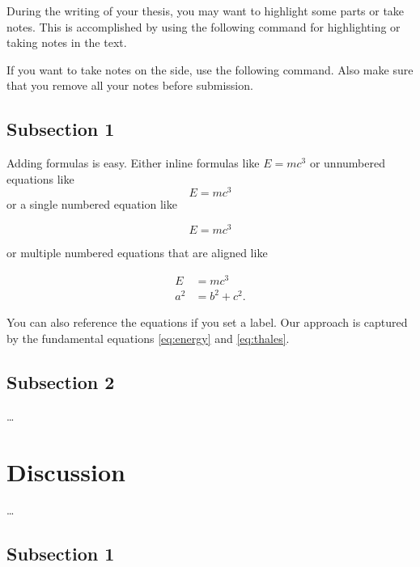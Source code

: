 During the writing of your thesis, you may want to highlight some parts or take notes. This is accomplished by using the following command for highlighting or taking notes in the text. 


If you want to take notes on the side, use the following command. Also make sure that you remove all your notes before submission.



\section{Subsection 1}
\label{ch:section2:sec:subsection1}
Adding formulas is easy. Either inline formulas like $E=mc^3$ or unnumbered equations like $$E=mc^3$$ or a single numbered equation like 

\begin{equation}
E=mc^3
\end{equation}

or multiple numbered equations that are aligned like

\begin{align}
E &=mc^3\label{eq:energy}\\
a^2 &=b^2 + c^2\label{eq:thales}.
\end{align}

You can also reference the equations if you set a label. Our approach is captured by the fundamental equations \eqref{eq:energy} and \eqref{eq:thales}.


\section{Subsection 2}
\label{ch:section2:sec:subsection2}

\dots 



\chapter{Discussion}
\label{ch:Discussion}

\dots

\section{Subsection 1}
\label{ch:discussion:sec:subsection1}

